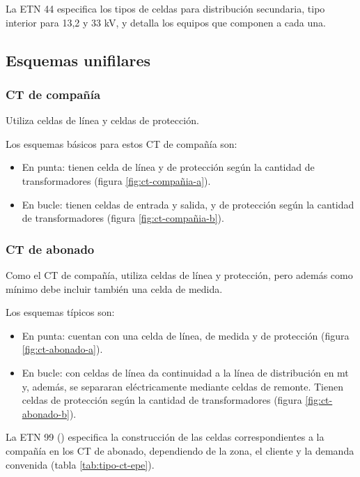 La ETN 44 \cite{etn-44} especifica los tipos de celdas para distribución secundaria, tipo interior para 13,2 y 33 kV, y detalla los equipos que componen a cada una.

\subsection{Esquemas unifilares}

\subsubsection{CT de compañía}

Utiliza celdas de línea y celdas de protección.

Los esquemas básicos para estos CT de compañía son:
\begin{itemize}
	\item En punta: tienen celda de línea y de protección según la cantidad de transformadores (figura \ref{fig:ct-compañia-a}).
	\item En bucle: tienen celdas de entrada y salida, y de protección según la cantidad de transformadores (figura \ref{fig:ct-compañia-b}).
\end{itemize}


\subsubsection{CT de abonado}

Como el CT de compañía, utiliza celdas de línea y protección, pero además como mínimo debe incluir también una celda de medida. 

Los esquemas típicos son:
\begin{itemize}
	\item En punta: cuentan con una celda de línea, de medida y de protección (figura \ref{fig:ct-abonado-a}).
	\item En bucle: con celdas de línea da continuidad a la línea de distribución en \acrshort{mt} y, además, se separaran eléctricamente mediante celdas de remonte. Tienen celdas de protección según la cantidad de transformadores (figura \ref{fig:ct-abonado-b}).
\end{itemize}


La ETN 99 (\cite{etn-99}) especifica la construcción de las celdas correspondientes a la compañía en los CT de abonado, dependiendo de la zona, el cliente y la demanda convenida (tabla \ref{tab:tipo-ct-epe}).

